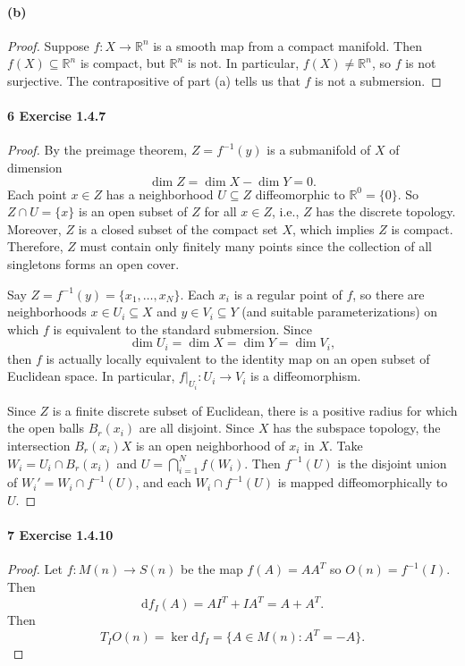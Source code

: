 \documentclass[12pt]{article}
\newlength{\myparskip}
\newenvironment{fullbox}{\begin{lrbox}{\savefullbox}\begin{minipage}{\dimexpr\textwidth-2\fboxsep\relax}\setlength{\parskip}{\myparskip}}{\end{minipage}\end{lrbox}\framebox[\textwidth]{\usebox{\savefullbox}}}
\newenvironment{pbox}[1][]{\begin{fullbox}\def\temp{#1}\ifx\temp\empty\else\paragraph{#1}\phantom{}\fi}{\end{fullbox}}
\theoremstyle{definition}
\newcommand{\R}{\mathbb{R}}
\newcommand{\<}{\langle}
\renewcommand{\>}{\rangle}
\newcommand{\seq}{\subseteq}
\newcommand{\dd}{\mathrm{d}}
\begin{document}
\begin{pbox}[(b)]
\end{pbox}

\begin{proof}
    Suppose $f : X \to \R^n$ is a smooth map from a compact manifold.
    Then $f(X) \seq \R^n$ is compact, but $\R^n$ is not.
    In particular, $f(X) \ne \R^n$, so $f$ is not surjective.
    The contrapositive of part (a) tells us that $f$ is not a submersion.
\end{proof}

\begin{pbox}[6 Exercise 1.4.7]
\end{pbox}

\begin{proof}
    By the preimage theorem, $Z = f^{-1}(y)$ is a submanifold of $X$ of dimension
    \[
        \dim Z = \dim X - \dim Y = 0.
    \]
    Each point $x \in Z$ has a neighborhood $U \seq Z$ diffeomorphic to $\R^0 = \{0\}$.
    So $Z \cap U = \{x\}$ is an open subset of $Z$ for all $x \in Z$, i.e., $Z$ has the discrete topology.
    Moreover, $Z$ is a closed subset of the compact set $X$, which implies $Z$ is compact.
    Therefore, $Z$ must contain only finitely many points since the collection of all singletons forms an open cover.

    Say $Z = f^{-1}(y) = \{x_1, \dots, x_N\}$.
    Each $x_i$ is a regular point of $f$, so there are neighborhoods $x \in U_i \seq X$ and $y \in V_i \seq Y$ (and suitable parameterizations) on which $f$ is equivalent to the standard submersion.
    Since
    \[
        \dim U_i = \dim X = \dim Y = \dim V_i,
    \]
    then $f$ is actually locally equivalent to the identity map on an open subset of Euclidean space.
    In particular, $f|_{U_i} : U_i \to V_i$ is a diffeomorphism.

    Since $Z$ is a finite discrete subset of Euclidean, there is a positive radius for which the open balls $B_r(x_i)$ are all disjoint.
    Since $X$ has the subspace topology, the intersection $B_r(x_i) X$ is an open neighborhood of $x_i$ in $X$.
    Take $W_i = U_i \cap B_r(x_i)$ and $U = \bigcap_{i=1}^{N} f(W_i)$.
    Then $f^{-1}(U)$ is the disjoint union of $W_i' = W_i \cap f^{-1}(U)$, and each $W_i \cap f^{-1}(U)$ is mapped diffeomorphically to $U$.
\end{proof}

\begin{pbox}[7 Exercise 1.4.10]
\end{pbox}

\begin{proof}
    Let $f : M(n) \to S(n)$ be the map $f(A) = AA^T$ so $O(n) = f^{-1}(I)$.
    Then
    \[
        \dd{f}_I(A) = AI^T + IA^T = A + A^T.
    \]
    Then
    \[
        T_I O(n) = \ker \dd{f}_I = \{A \in M(n) : A^T = -A\}.
    \]
\end{proof}
\end{document}
